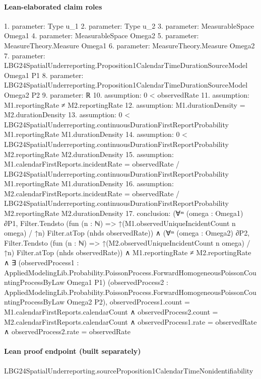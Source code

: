 \documentclass[10pt]{article}
\begin{document}
\paragraph{Lean-elaborated claim roles}\begin{ReviewVerbatim}
1. parameter: Type u_1
2. parameter: Type u_2
3. parameter: MeasurableSpace Omega1
4. parameter: MeasurableSpace Omega2
5. parameter: MeasureTheory.Measure Omega1
6. parameter: MeasureTheory.Measure Omega2
7. parameter: LBG24SpatialUnderreporting.Proposition1CalendarTimeDurationSourceModel Omega1 P1
8. parameter: LBG24SpatialUnderreporting.Proposition1CalendarTimeDurationSourceModel Omega2 P2
9. parameter: ℝ
10. assumption: 0 < observedRate
11. assumption: M1.reportingRate ≠ M2.reportingRate
12. assumption: M1.durationDensity = M2.durationDensity
13. assumption: 0 < LBG24SpatialUnderreporting.continuousDurationFirstReportProbability M1.reportingRate M1.durationDensity
14. assumption: 0 < LBG24SpatialUnderreporting.continuousDurationFirstReportProbability M2.reportingRate M2.durationDensity
15. assumption: M1.calendarFirstReports.incidentRate =
  observedRate / LBG24SpatialUnderreporting.continuousDurationFirstReportProbability M1.reportingRate M1.durationDensity
16. assumption: M2.calendarFirstReports.incidentRate =
  observedRate / LBG24SpatialUnderreporting.continuousDurationFirstReportProbability M2.reportingRate M2.durationDensity
17. conclusion: (∀ᵐ (omega : Omega1) ∂P1,
    Filter.Tendsto (fun (n : ℕ) => ↑(M1.observedUniqueIncidentCount n omega) / ↑n) Filter.atTop (nhds observedRate)) ∧
  (∀ᵐ (omega : Omega2) ∂P2,
      Filter.Tendsto (fun (n : ℕ) => ↑(M2.observedUniqueIncidentCount n omega) / ↑n) Filter.atTop (nhds observedRate)) ∧
    M1.reportingRate ≠ M2.reportingRate ∧
      ∃ (observedProcess1 :
        AppliedModelingLib.Probability.PoissonProcess.ForwardHomogeneousPoissonCountingProcessByLaw Omega1 P1)
        (observedProcess2 :
        AppliedModelingLib.Probability.PoissonProcess.ForwardHomogeneousPoissonCountingProcessByLaw Omega2 P2),
        observedProcess1.count = M1.calendarFirstReports.calendarCount ∧
          observedProcess2.count = M2.calendarFirstReports.calendarCount ∧
            observedProcess1.rate = observedRate ∧ observedProcess2.rate = observedRate
\end{ReviewVerbatim}

\paragraph{Lean proof endpoint (built separately)}\begin{ReviewVerbatim}
LBG24SpatialUnderreporting.sourceProposition1CalendarTimeNonidentifiability
\end{ReviewVerbatim}
\end{document}
